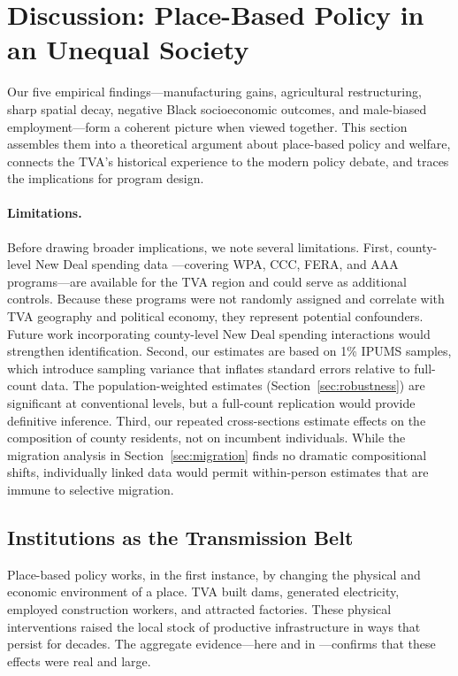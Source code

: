 \documentclass[12pt]{article}
\begin{document}
\section{Discussion: Place-Based Policy in an Unequal Society}\label{sec:discussion}

Our five empirical findings---manufacturing gains, agricultural restructuring, sharp spatial decay, negative Black socioeconomic outcomes, and male-biased employment---form a coherent picture when viewed together. This section assembles them into a theoretical argument about place-based policy and welfare, connects the TVA's historical experience to the modern policy debate, and traces the implications for program design.

\paragraph{Limitations.} Before drawing broader implications, we note several limitations. First, county-level New Deal spending data \citep{fishback2003}---covering WPA, CCC, FERA, and AAA programs---are available for the TVA region and could serve as additional controls. Because these programs were not randomly assigned and correlate with TVA geography and political economy, they represent potential confounders. Future work incorporating county-level New Deal spending interactions would strengthen identification. Second, our estimates are based on 1\% IPUMS samples, which introduce sampling variance that inflates standard errors relative to full-count data. The population-weighted estimates (Section~\ref{sec:robustness}) are significant at conventional levels, but a full-count replication would provide definitive inference. Third, our repeated cross-sections estimate effects on the composition of county residents, not on incumbent individuals. While the migration analysis in Section~\ref{sec:migration} finds no dramatic compositional shifts, individually linked data would permit within-person estimates that are immune to selective migration.

\subsection{Institutions as the Transmission Belt}

Place-based policy works, in the first instance, by changing the physical and economic environment of a place. TVA built dams, generated electricity, employed construction workers, and attracted factories. These physical interventions raised the local stock of productive infrastructure in ways that persist for decades. The aggregate evidence---here and in \citet{kline2014}---confirms that these effects were real and large.
\end{document}

